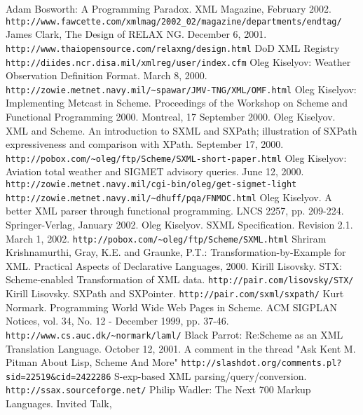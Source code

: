 \documentclass[10pt]{llncs}
\begin{document}
\begin{thebibliography}{10}
 Adam Bosworth: A Programming Paradox. XML Magazine, February 2002. \texttt{http://www.fawcette.com/xmlmag/2002\_02/magazine/departments/endtag/} 
 James Clark, The Design of RELAX NG. December 6, 2001. \texttt{http://www.thaiopensource.com/relaxng/design.html} 
 DoD XML Registry \texttt{http://diides.ncr.disa.mil/xmlreg/user/index.cfm} 
 Oleg Kiselyov: Weather Observation Definition Format. March 8, 2000. \texttt{http://zowie.metnet.navy.mil/\textasciitilde{}spawar/JMV-TNG/XML/OMF.html} 
 Oleg Kiselyov: Implementing Metcast in Scheme. Proceedings of the Workshop on Scheme and Functional Programming 2000. Montreal, 17 September 2000.
 Oleg Kiselyov. XML and Scheme. An introduction to
SXML and SXPath;  illustration of SXPath expressiveness and comparison with
XPath. September 17, 2000. \texttt{http://pobox.com/\textasciitilde{}oleg/ftp/Scheme/SXML-short-paper.html} 
 Oleg Kiselyov: Aviation total weather and SIGMET advisory queries. June 12, 2000.\\  \texttt{http://zowie.metnet.navy.mil/cgi-bin/oleg/get-sigmet-light}  \texttt{http://zowie.metnet.navy.mil/\textasciitilde{}dhuff/pqa/FNMOC.html} 
 Oleg Kiselyov. A better XML parser through functional programming. LNCS 2257, pp. 209-224. Springer-Verlag, January 2002.
 Oleg Kiselyov. SXML Specification. Revision 2.1. March 1, 2002. \texttt{http://pobox.com/\textasciitilde{}oleg/ftp/Scheme/SXML.html} 
 Shriram Krishnamurthi, Gray, K.E. and Graunke, P.T.: Transformation-by-Example for XML. Practical Aspects of Declarative Languages, 2000.
 Kirill Lisovsky. STX: Scheme-enabled Transformation of XML data.  \texttt{http://pair.com/lisovsky/STX/} 
 Kirill Lisovsky. SXPath and SXPointer.  \texttt{http://pair.com/sxml/sxpath/} 
 Kurt Normark. Programming World Wide Web Pages in Scheme. ACM SIGPLAN Notices, vol. 34, No. 12 - December 1999, pp. 37-46. \texttt{http://www.cs.auc.dk/\textasciitilde{}normark/laml/} 
 Black Parrot: Re:Scheme as an XML Translation Language. 
October 12, 2001. A comment in the thread "Ask Kent M. Pitman About Lisp, Scheme And More" \texttt{http://slashdot.org/comments.pl?sid=22519\&cid=2422286} 
 S-exp-based XML parsing/query/conversion.  \texttt{http://ssax.sourceforge.net/} 
 Philip Wadler: The Next 700 Markup Languages. Invited Talk,

\end{thebibliography}
\end{document}
